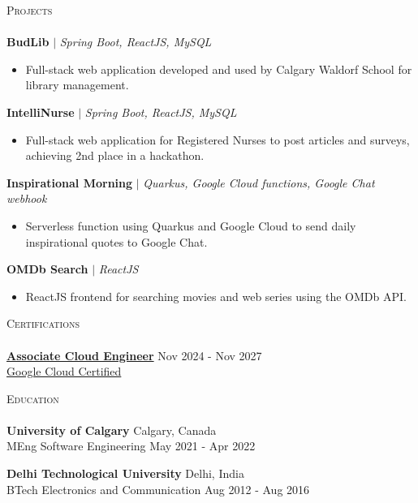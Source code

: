 \documentclass[a4paper]{article}
\newcommand{\lineunder} {
    \vspace*{-8pt} \\
    \hspace*{-18pt} \hrulefill \\
}
\newcommand{\header} [1] {
    \vspace*{5pt}
    {\hspace*{-18pt}\vspace*{6pt} \large\textsc{#1}}
    \vspace*{-6pt} \lineunder
}
\newcommand{\resumeHeadingProject}[3]{
    \vspace{1mm}
    {\textbf{#1}} $|$ \emph{#2} %
    \vspace{-2mm}
}
\newcommand{\resumeItemProject}[1]{
  \item{
    \begin{justify}
    \setlength{\rightskip}{0.15in} {#1 \vspace{-4pt}}
    \end{justify}
  }
}
\newcommand{\resumeHeadingEducation}[4]{
    \textbf{#1} \hfill {#2}\\
    {#3} \hfill {#4}\\
    \vspace{2mm}
}
\begin{document}
\header{Projects}

\resumeHeadingProject {BudLib} {Spring Boot, ReactJS, MySQL} {Jan 2022 - Apr 2022}
\begin{itemize}
    \resumeItemProject {Full-stack web application developed and used by Calgary Waldorf School for library management.}
\end{itemize}

\resumeHeadingProject {IntelliNurse} {Spring Boot, ReactJS, MySQL} {Feb 2022 - Mar 2022}
\begin{itemize}
    \resumeItemProject {Full-stack web application for Registered Nurses to post articles and surveys, achieving 2nd place in a hackathon.}
\end{itemize}

\resumeHeadingProject {Inspirational Morning} {Quarkus, Google Cloud functions, Google Chat webhook} {Jun 2024 - Jun 2024}
\begin{itemize}
    \resumeItemProject {Serverless function using Quarkus and Google Cloud to send daily inspirational quotes to Google Chat.}
\end{itemize}

\resumeHeadingProject {OMDb Search} {ReactJS} {Jun 2022 - Jun 2022}
\begin{itemize}
    \resumeItemProject {ReactJS frontend for searching movies and web series using the OMDb API.}
\end{itemize}


\header{Certifications}
\href{https://www.credly.com/badges/52bb681c-f535-47e7-b669-78e9b4d7c4a0}{\textbf{Associate Cloud Engineer}} \hfill Nov 2024 - Nov 2027\\
\href{https://www.credly.com/badges/52bb681c-f535-47e7-b669-78e9b4d7c4a0}{Google Cloud Certified}
\vspace{2mm}


\header{Education}

\resumeHeadingEducation {University of Calgary} {Calgary, Canada} {MEng Software Engineering} {May 2021 - Apr 2022}
\resumeHeadingEducation {Delhi Technological University} {Delhi, India} {BTech Electronics and Communication} {Aug 2012 - Aug 2016}


\
\end{document}
